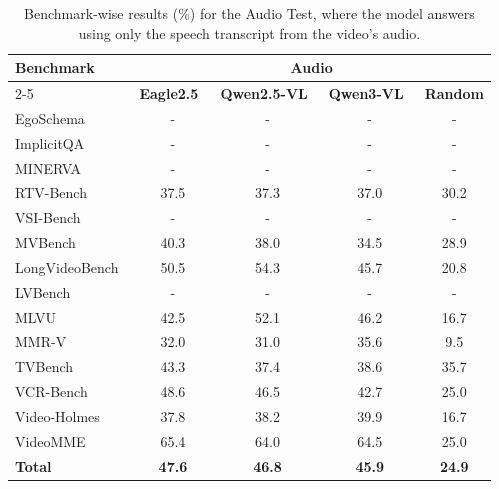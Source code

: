         \begin{table}[h]
        \centering
        \caption{Benchmark-wise results (\%) for the Audio Test, where the model answers using only the speech transcript from the video's audio.}
        \footnotesize
        \setlength{\tabcolsep}{4pt}
        \begin{tabular}{lcccc}
        \toprule
        \multirow{2}{*}{\textbf{Benchmark}} & \multicolumn{4}{c}{\scriptsize \textbf{Audio}} \\
        \cmidrule(lr){2-5}
         & {\scriptsize \textbf{Eagle2.5~\cite{eagle25}}} & {\scriptsize \textbf{Qwen2.5-VL}~\cite{qwen25vl}} & {\scriptsize \textbf{Qwen3-VL}~\cite{qwem3_vl}} & {\scriptsize \textbf{Random}} \\
        \midrule
        EgoSchema~\cite{egoschema} & - & - & - & - \\
        ImplicitQA~\cite{implicitqa} & - & - & - & - \\
        MINERVA~\cite{minerva} & - & - & - & - \\
        RTV-Bench~\cite{rtvbench} & 37.5 & 37.3 & 37.0 & 30.2 \\
        VSI-Bench~\cite{vsibench} & - & - & - & - \\
        MVBench~\cite{mvbench} & 40.3 & 38.0 & 34.5 & 28.9 \\
        LongVideoBench~\cite{longvideobench} & 50.5 & 54.3 & 45.7 & 20.8 \\
        LVBench~\cite{lvbench} & - & - & - & - \\
        MLVU~\cite{mlvu} & 42.5 & 52.1 & 46.2 & 16.7 \\
        MMR-V~\cite{mmrv} & 32.0 & 31.0 & 35.6 & 9.5 \\
        TVBench~\cite{tvbench} & 43.3 & 37.4 & 38.6 & 35.7 \\
        VCR-Bench~\cite{vcrbench} & 48.6 & 46.5 & 42.7 & 25.0 \\
        Video-Holmes~\cite{videoholmes} & 37.8 & 38.2 & 39.9 & 16.7 \\
        VideoMME~\cite{videomme} & 65.4 & 64.0 & 64.5 & 25.0 \\
        \midrule
        \textbf{Total} & \textbf{47.6} & \textbf{46.8} & \textbf{45.9} & \textbf{24.9} \\
        \bottomrule
        \end{tabular}
        \label{tab:audio}
        \end{table}

